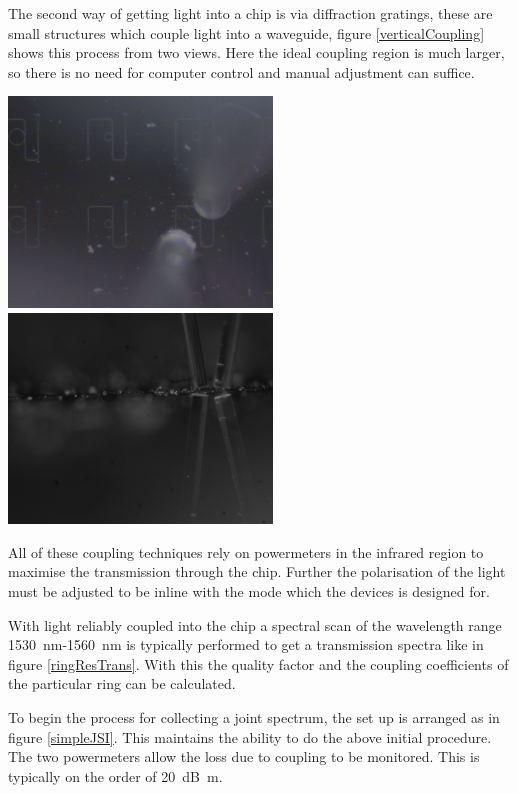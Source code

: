 The second way of getting light into a chip is via diffraction gratings, these are small structures which couple light into a waveguide, figure \ref{verticalCoupling} shows this process from two views. Here the ideal coupling region is much larger, so there is no need for computer control and manual adjustment can suffice.
\newline

\begingroup
    \centering  
    \includegraphics[width=7cm]{img/method/chipPictures/verticalCouplingTopView.png}
    \includegraphics[width=7cm]{img/method/chipPictures/verticalCouplingSideView.png}
     \vspace{3pt} \label{verticalCoupling}
\endgroup

All of these coupling techniques rely on powermeters in the infrared region to maximise the transmission through the chip. Further the polarisation of the light must be adjusted to be inline with the mode which the devices is designed for. 

With light reliably coupled into the chip a spectral scan of the wavelength range \SI{1530}{\nano\meter}-\SI{1560}{\nano\meter} is typically performed to get a transmission spectra like in figure \ref{ringResTrans}. With this the quality factor and the coupling coefficients of the particular ring can be calculated. 

To begin the process for collecting a joint spectrum, the set up is arranged as in figure \ref{simpleJSI}. This maintains the ability to do the above initial procedure. The two powermeters allow the loss due to coupling to be monitored. This is typically on the order of \SI{20}{\deci\bel\m}. 

